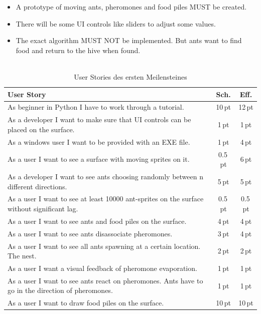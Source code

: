 \begin{itemize}[noitemsep]
\item A prototype of moving ants, pheromones and food piles MUST be created.
\item There will be some UI controls like sliders to adjust some values.
\item The exact algorithm MUST NOT be implemented. But ants want to find food and return to the hive when found. \\\\
\end{itemize}




\begin{table}[H]
\small\sffamily\renewcommand{\arraystretch}{1.5}
\begin{tabular}{| p{12cm} | c | c |}
  \hline
  \bfseries{User Story} & \bfseries{Sch.} & \bfseries{Eff.}  \\
  \hline
  As beginner in Python I have to work through a tutorial. & 10\,pt & 12\,pt \\
  \hline
  As a developer I want to make sure that UI controls can be placed on the surface. & 1\,pt &1\,pt \\
  \hline
  As a windows user I want to be provided with an EXE file. & 1\,pt &4\,pt \\
  \hline
  As a user I want to see a surface with moving sprites on it. & 0.5\,pt & 6\,pt \\
  \hline
  As a developer I want to see ants choosing randomly between n different directions. & 5\,pt & 5\,pt \\
  \hline
  As a user I want to see at least 10000 ant-sprites on the surface without significant lag. & 0.5\,pt & 0.5\,pt \\
  \hline
  As a user I want to see ants and food piles on the surface. & 4\,pt & 4\,pt \\
  \hline
  As a user I want to see ants disassociate pheromones. & 3\,pt & 4\,pt \\
  \hline
  As a user I want to see all ants spawning at a certain location. The nest. & 2\,pt & 2\,pt \\
  \hline
  As a user I want a visual feedback of pheromone evaporation. & 1\,pt & 1\,pt \\
  \hline
  As a user I want to see ants react on pheromones. Ants have to go in the direction of pheromones. & 1\,pt & 1\,pt \\
  \hline
  As a user I want to draw food piles on the surface. & 10\,pt & 10\,pt \\
  \hline
\end{tabular}
\captionsetup{type=table} %
\caption{User Stories des ersten Meilensteines}
\end{table}

